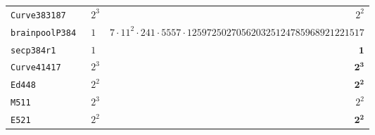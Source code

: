 \documentclass[11pt,fleqn]{article}
\begin{document}
\begin{tabularx}{\textwidth}{llR}
\texttt{\footnotesize Curve383187   }& $\scriptstyle 2^3$    & $\scriptstyle 2^2                                                                  $\\
\texttt{\footnotesize brainpoolP384 }& $\scriptstyle 1  $    & $\scriptstyle 7 \cdot 11^2 \cdot 241 \cdot 5557 \cdot 125972502705620325124785968921221517         $\\
\texttt{\footnotesize secp384r1     }& $\scriptstyle 1  $    & $\scriptstyle \mathbf{1}                                                                    $\\
\texttt{\footnotesize Curve41417    }& $\scriptstyle 2^3$    & $\scriptstyle \mathbf{2^3}                                                                  $\\
\texttt{\footnotesize Ed448         }& $\scriptstyle 2^2$    & $\scriptstyle \mathbf{2^2}                                                                  $\\
\texttt{\footnotesize M511          }& $\scriptstyle 2^3$    & $\scriptstyle 2^2                                                                  $\\
\texttt{\footnotesize E521          }& $\scriptstyle 2^2$    & $\scriptstyle \mathbf{2^2}$ \\
\hline
\end{tabularx}


\printbibliography

\end{document}
